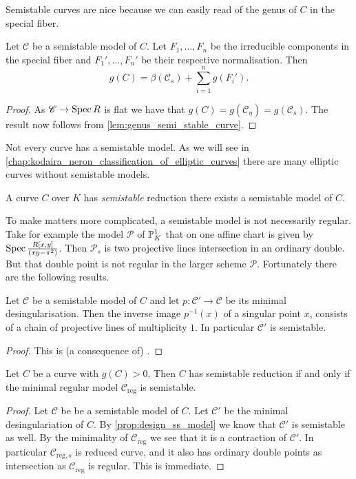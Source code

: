 Semistable curves are nice because we can easily read of the genus of $C$ in the special fiber. 
\begin{lemma}\label{lem:genus_semi_stable_model}
	Let $\mathscr C$ be a semistable model of  $C$. 
	Let $F_1, \ldots, F_n$ be the irreducible components in the special fiber and  $F_1', \ldots, F_n'$ be their respective normalisation. 
	Then \[
		g(C) = \beta(\mathscr C_s) + \sum_{i = 1}^{n} g(F_i')
	.\] 
\end{lemma}
\begin{proof}
	As $\mathscr C \to \operatorname{Spec} R$ is flat we have that $g(C) = g(\mathscr C_\eta) = g(\mathscr C_s)$. 
	The result now follows from \cref{lem:genus_semi_stable_curve}. 
\end{proof}

Not every curve has a semistable model.
As we will see in \cref{chap:kodaira_neron_classification_of_elliptic_curves} there are many elliptic curves without semistable models. 
\begin{definition}
	A curve $C$ over $K$ has \emph{semistable} reduction there exists a semistable model of $C$. 
\end{definition}
To make matters more complicated, a semistable model is not necessarily regular. 
Take for example the model $\mathscr P$ of $\mathbb{P}^{1}_K$ that on one affine chart is given by $\operatorname{Spec} \frac{R[x, y]}{(xy  - \pi^{2})}$. 
Then $\mathscr P_s$ is two projective lines intersection in an ordinary double.
But that double point is not regular in the larger scheme $\mathscr P$. 
Fortunately there are the following results. 
\begin{proposition}\label{prop:design_ss_model}
	Let $\mathscr C$ be a semistable model of $C$ and let $p:\mathscr C' \to \mathscr C$
	be its minimal desingularisation. 
	Then the inverse image $p^{-1}(x)$ of a singular point $x$, consists of a chain of projective lines of multiplicity $1$. 
	In particular $\mathscr C'$ is semistable. 
\end{proposition}
\begin{proof}
	This is (a consequence of) \cite[cor.\ 10.3.25]{liuAlgebraicGeometryArithmetic2002}.
\end{proof}
\begin{corollary}
	Let $C$ be a curve with  $g(C) > 0$.
	Then $C$ has semistable reduction if and only if the minimal regular model  $\mathscr C_\text{reg} $ is semistable. 
\end{corollary}
\begin{proof}
	\ltr Let $\mathscr C$ be be a semistable model of $C$. 
	Let $\mathscr C'$ be the minimal desingulariation of $C$. 
	By \cref{prop:design_ss_model} we know that  $\mathscr C'$ is semistable as well. 
	By the minimality of $\mathscr C_\text{reg} $ we see that it is a contraction of $\mathscr C'$. 
	In particular $\mathscr C_{\text{reg}, s}$ is reduced curve, and it also has ordinary double points as intersection as $\mathscr C_\text{reg} $ is regular.
	\rtl This is immediate. 
\end{proof}

